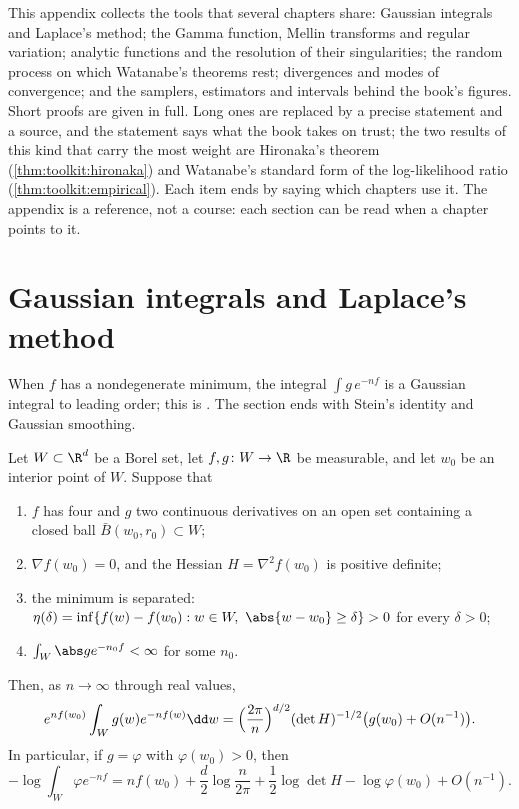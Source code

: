 \begin{refsection}

This appendix collects the tools that several chapters share: Gaussian integrals and Laplace's method; the Gamma function, Mellin transforms and regular variation; analytic functions and the resolution of their singularities; the random process on which Watanabe's theorems rest; divergences and modes of convergence; and the samplers, estimators and intervals behind the book's figures. Short proofs are given in full. Long ones are replaced by a precise statement and a source, and the statement says what the book takes on trust; the two results of this kind that carry the most weight are Hironaka's theorem (\cref{thm:toolkit:hironaka}) and Watanabe's standard form of the log-likelihood ratio (\cref{thm:toolkit:empirical}). Each item ends by saying which chapters use it. The appendix is a reference, not a course: each section can be read when a chapter points to it.

\section{Gaussian integrals and Laplace's method}\label{sec:toolkit:gaussian}

When $f$ has a nondegenerate minimum, the integral $\int g\,e^{-nf}$ is a Gaussian integral to leading order; this is . The section ends with Stein's identity and Gaussian smoothing.

\begin{theorem}\label{thm:toolkit:laplace}
Let $W\subset\R^d$ be a Borel set, let $f,g\colon W\to\R$ be measurable, and let $w_0$ be an interior point of $W$. Suppose that
\begin{enumerate}
\item $f$ has four and $g$ two continuous derivatives on an open set containing a closed ball $\bar B(w_0,r_0)\subset W$;
\item $\nabla f(w_0)=0$, and the Hessian $H=\nabla^2f(w_0)$ is positive definite;
\item the minimum is separated: $\eta(\delta)=\inf\{f(w)-f(w_0):w\in W,\ \abs{w-w_0}\ge\delta\}>0$ for every $\delta>0$;
\item $\int_W\abs ge^{-n_0f}<\infty$ for some $n_0$.
\end{enumerate}
Then, as $n\to\infty$ through real values,
\begin{equation}\label{eq:toolkit:laplace}
e^{nf(w_0)}\int_Wg(w)e^{-nf(w)}\dd w=\Bigl(\frac{2\pi}n\Bigr)^{d/2}(\det H)^{-1/2}\bigl(g(w_0)+O(n^{-1})\bigr).
\end{equation}
In particular, if $g=\varphi$ with $\varphi(w_0)>0$, then
\[
-\log\int_W\varphi e^{-nf}=nf(w_0)+\frac d2\log\frac n{2\pi}+\frac12\log\det H-\log\varphi(w_0)+O(n^{-1}).
\]
\end{theorem}


\end{refsection}
